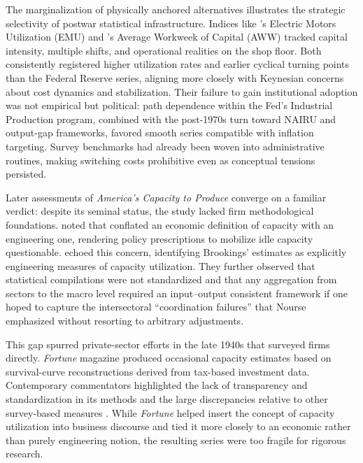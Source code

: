 \documentclass[11pt]{article}
\begin{document}
The marginalization of physically anchored alternatives illustrates the strategic selectivity of postwar statistical infrastructure. Indices like \citet{foss1963}'s Electric Motors Utilization (EMU) and \citet{taubmangottschalk1971}'s Average Workweek of Capital (AWW) tracked capital intensity, multiple shifts, and operational realities on the shop floor. Both consistently registered higher utilization rates and earlier cyclical turning points than the Federal Reserve series, aligning more closely with Keynesian concerns about cost dynamics and stabilization. Their failure to gain institutional adoption was not empirical but political: path dependence within the Fed's Industrial Production program, combined with the post-1970s turn toward NAIRU and output-gap frameworks, favored smooth series compatible with inflation targeting. Survey benchmarks had already been woven into administrative routines, making switching costs prohibitive even as conceptual tensions persisted.

Later assessments of \emph{America's Capacity to Produce} converge on a familiar verdict: despite its seminal status, the study lacked firm methodological foundations. \citet{burns1954} noted that \citet{nourseetal1934} conflated an economic definition of capacity with an engineering one, rendering policy prescriptions to mobilize idle capacity questionable. \citet{kleindavid1958} echoed this concern, identifying Brookings' estimates as explicitly engineering measures of capacity utilization. They further observed that statistical compilations were not standardized and that any aggregation from sectors to the macro level required an input--output consistent framework if one hoped to capture the intersectoral ``coordination failures'' that Nourse emphasized without resorting to arbitrary adjustments.

This gap spurred private-sector efforts in the late 1940s that surveyed firms directly. \emph{Fortune} magazine produced occasional capacity estimates based on survival-curve reconstructions derived from tax-based investment data. Contemporary commentators highlighted the lack of transparency and standardization in its methods and the large discrepancies relative to other survey-based measures \citep{butler1958,phillips1963}. While \emph{Fortune} helped insert the concept of capacity utilization into business discourse and tied it more closely to an economic rather than purely engineering notion, the resulting series were too fragile for rigorous research.
\end{document}
